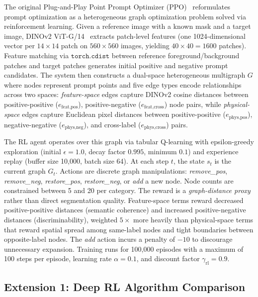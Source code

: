 \documentclass[journal, onecolumn]{IEEEtran}
\begin{document}
The original Plug-and-Play Point Prompt Optimizer (PPO)~\cite{Liu2025PlugAndPlayPPO} reformulates prompt optimization as a heterogeneous graph optimization problem solved via reinforcement learning. Given a reference image with a known mask and a target image, DINOv2 ViT-G/14~\cite{Oquab2024DINOv2} extracts patch-level features (one 1024-dimensional vector per $14 \times 14$ patch on $560 \times 560$ images, yielding $40 \times 40 = 1600$ patches). Feature matching via $\texttt{torch.cdist}$ between reference foreground/background patches and target patches generates initial positive and negative prompt candidates. The system then constructs a dual-space heterogeneous multigraph $G$ where nodes represent prompt points and five edge types encode relationships across two spaces: \textit{feature-space} edges capture DINOv2 cosine distances between positive-positive ($e_{\text{feat,pos}}$), positive-negative ($e_{\text{feat,cross}}$) node pairs, while \textit{physical-space} edges capture Euclidean pixel distances between positive-positive ($e_{\text{phys,pos}}$), negative-negative ($e_{\text{phys,neg}}$), and cross-label ($e_{\text{phys,cross}}$) pairs.

The RL agent operates over this graph via tabular Q-learning with epsilon-greedy exploration (initial $\epsilon = 1.0$, decay factor $0.995$, minimum $0.1$) and experience replay (buffer size 10,000, batch size 64). At each step $t$, the state $s_t$ is the current graph $G_t$. Actions are discrete graph manipulations: \textit{remove\_pos}, \textit{remove\_neg}, \textit{restore\_pos}, \textit{restore\_neg}, or \textit{add} a new node. Node counts are constrained between 5 and 20 per category. The reward is a \textit{graph-distance proxy} rather than direct segmentation quality. Feature-space terms reward decreased positive-positive distances (semantic coherence) and increased positive-negative distances (discriminability), weighted $5\times$ more heavily than physical-space terms that reward spatial spread among same-label nodes and tight boundaries between opposite-label nodes. The \textit{add} action incurs a penalty of $-10$ to discourage unnecessary expansion. Training runs for 100,000 episodes with a maximum of 100 steps per episode, learning rate $\alpha = 0.1$, and discount factor $\gamma_{\text{rl}} = 0.9$.

\subsection{Extension 1: Deep RL Algorithm Comparison}
\end{document}
